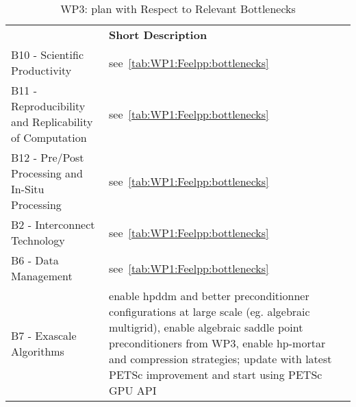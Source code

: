 \begin{table}[!ht]
    \centering



    \centering
    {
        \setlength{\parindent}{0pt}
        \def\arraystretch{1.25}
        {
            \fontsize{9}{11}\selectfont
            \begin{tabular}{!{\color{numpexgray}\vrule}p{.25\linewidth}!{\color{numpexgray}\vrule}p{.6885\linewidth}!{\color{numpexgray}\vrule}}

     &  {\rule{0pt}{2.5ex}\color{white}\bf Short Description }\\

    B10 - Scientific Productivity &see~\cref{tab:WP1:Feelpp:bottlenecks} \\
    B11 - Reproducibility and Replicability of Computation & see~\cref{tab:WP1:Feelpp:bottlenecks}\\
    B12 - Pre/Post Processing and In-Situ Processing & see~\cref{tab:WP1:Feelpp:bottlenecks} \\
    B2 - Interconnect Technology & see~\cref{tab:WP1:Feelpp:bottlenecks}\\
    B6 - Data Management & see~\cref{tab:WP1:Feelpp:bottlenecks} \\
    B7 - Exascale Algorithms & enable hpddm and better preconditionner configurations at large scale (eg. algebraic multigrid), enable algebraic saddle point preconditioners from WP3, enable hp-mortar and compression strategies; update with latest PETSc improvement and start using PETSc GPU API\\
\hline
\end{tabular}
        }
    }
    \caption{WP3: \Feelpp plan with Respect to Relevant Bottlenecks}
    \label{tab:WP3:Feelpp:bottlenecks}
\end{table}
